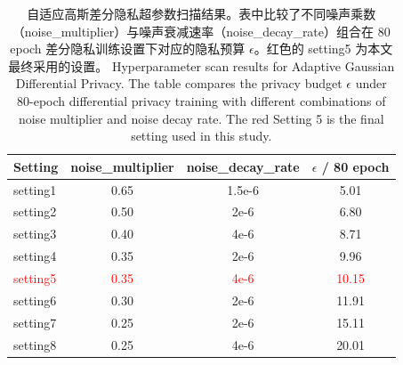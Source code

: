 \begin{table}[!htb]
\centering
\caption{自适应高斯差分隐私超参数扫描结果。表中比较了不同噪声乘数（noise\_multiplier）与噪声衰减速率（noise\_decay\_rate）组合在 80 epoch 差分隐私训练设置下对应的隐私预算 $\epsilon$。红色的 setting5 为本文最终采用的设置。 Hyperparameter scan results for Adaptive Gaussian Differential Privacy. The table compares the privacy budget $\epsilon$ under 80-epoch differential privacy training with different combinations of noise multiplier and noise decay rate. The red Setting 5 is the final setting used in this study.}
\label{tab:privacy-scan}
\begin{tabular}{lccc}
\toprule
Setting & noise\_multiplier & noise\_decay\_rate & $\epsilon$ / 80 epoch \\
\midrule
setting1 & 0.65 & 1.5e-6 & 5.01 \\
setting2 & 0.50 & 2e-6 & 6.80 \\
setting3 & 0.40 & 4e-6 & 8.71 \\
setting4 & 0.35 & 2e-6 & 9.96 \\
\textcolor{red}{setting5} & \textcolor{red}{0.35} & \textcolor{red}{4e-6} & \textcolor{red}{10.15} \\
setting6 & 0.30 & 2e-6 & 11.91 \\
setting7 & 0.25 & 2e-6 & 15.11 \\
setting8 & 0.25 & 4e-6 & 20.01 \\
\bottomrule
\end{tabular}
\end{table}
